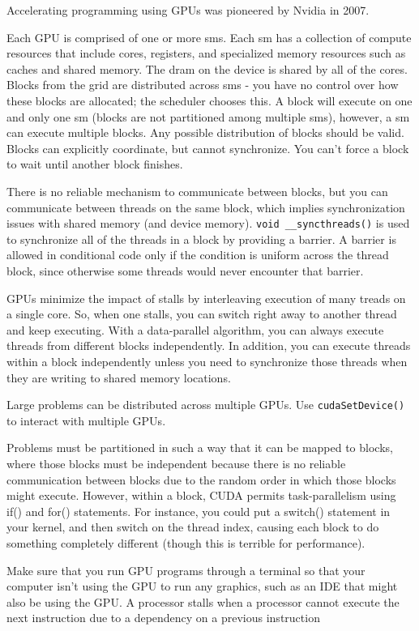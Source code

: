 \documentclass[10pt]{article}
\begin{document}
\begin{flushleft}
Accelerating programming using GPUs was pioneered by Nvidia in 2007.

Each GPU is comprised of one or more \gls{sm}s. Each \gls{sm} has a collection of compute resources that include cores, registers, and specialized memory resources such as caches and shared memory. The \gls{dram} on the device is shared by all of the cores. Blocks from the grid are distributed across \gls{sm}s - you have no control over how these blocks are allocated; the scheduler chooses this. A block will execute on one and only one \gls{sm} (blocks are not partitioned among multiple \gls{sm}s), however, a \gls{sm} can execute multiple blocks. Any possible distribution of blocks should be valid. Blocks can explicitly coordinate, but cannot synchronize. You can't force a block to wait until another block finishes. 


There is no reliable mechanism to communicate between blocks, but you can communicate between threads on the same block, which implies synchronization issues with shared memory (and device memory). {\tt void \_\_syncthreads()} is used to synchronize all of the threads in a block by providing a barrier. A barrier is allowed in conditional code only if the condition is uniform across the thread block, since otherwise some threads would never encounter that barrier. 

 GPUs minimize the impact of stalls by interleaving execution of many treads on a single core. So, when one stalls, you can switch right away to another thread and keep executing. With a data-parallel algorithm, you can always execute threads from different blocks independently. In addition, you can execute threads within a block independently unless you need to synchronize those threads when they are writing to shared memory locations.

Large problems can be distributed across multiple GPUs. Use {\tt cudaSetDevice()} to interact with multiple GPUs. 

Problems must be partitioned in such a way that it can be mapped to blocks, where those blocks must be independent because there is no reliable communication between blocks due to the random order in which those blocks might execute. However, within a block, CUDA permits task-parallelism using if() and for() statements. For instance, you could put a switch() statement in your kernel, and then switch on the thread index, causing each block to do something completely different (though this is terrible for performance).

Make sure that you run GPU programs through a terminal so that your computer isn't using the GPU to run any graphics, such as an IDE that might also be using the GPU. A processor stalls when a processor cannot execute the next instruction due to a dependency on a previous instruction


\end{flushleft}
\end{document}

